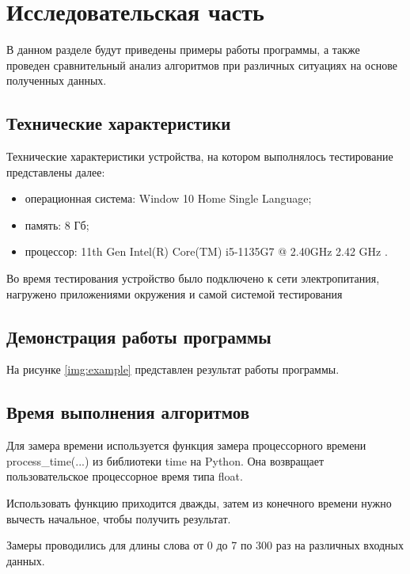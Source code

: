 \chapter{Исследовательская часть}

В данном разделе будут приведены примеры работы программы, а также проведен сравнительный анализ алгоритмов при различных ситуациях на основе полученных данных.

\section{Технические характеристики}

Технические характеристики устройства, на котором выполнялось тестирование представлены далее:

\begin{itemize}
    \item операционная система: Window 10 Home Single Language;
    \item память: 8 Гб;
    \item процессор: 11th Gen Intel(R) Core(TM) i5-1135G7 @ 2.40GHz   2.42 GHz .
\end{itemize}

Во время тестирования устройство было подключено к сети электропитания, нагружено приложениями окружения и самой системой тестирования

\section{Демонстрация работы программы}

На рисунке \ref{img:example} представлен результат работы программы.

\clearpage

\section{Время выполнения алгоритмов}

Для замера времени используется функция замера процессорного времени process\_time(...) из библиотеки time на Python. Она возвращает пользовательское процессорное время типа float.

Использовать функцию приходится дважды, затем из конечного времени нужно вычесть начальное, чтобы получить результат.

Замеры проводились для длины слова от 0 до 7 по 300 раз на различных входных данных.

